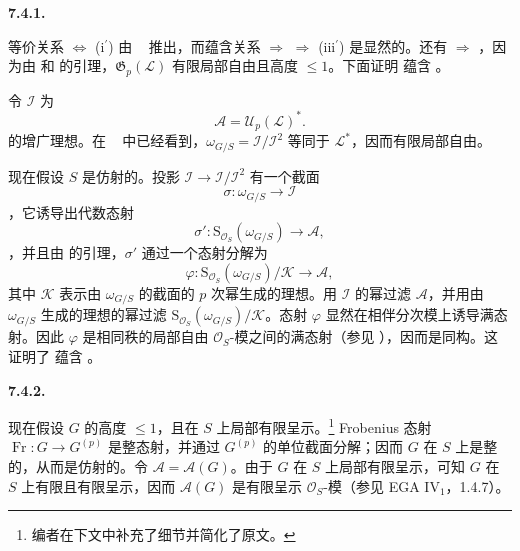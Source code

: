 \medskip
\noindent\textbf{7.4.1.}
\label{sga3:VIIA:7.4.1}

等价关系  \(\Leftrightarrow\) (i\(^{\prime}\)) 由 ~ 推出，而蕴含关系  \(\Rightarrow\)  \(\Rightarrow\) (iii\(^{\prime}\)) 是显然的。还有  \(\Rightarrow\) ，因为由  和  的引理，\(\mathfrak G_p(\mathcal L)\) 有限局部自由且高度 \(\leq1\)。下面证明  蕴含 。

令 \(\mathcal I\) 为
\[
  \mathcal A=\mathcal U_p(\mathcal L)^{*}.
\]
的增广理想。在 ~ 中已经看到，\(\omega_{G/S}=\mathcal I/\mathcal I^2\) 等同于 \(\mathcal L^{*}\)，因而有限局部自由。

现在假设 \(S\) 是仿射的。投影 \(\mathcal I\to\mathcal I/\mathcal I^2\) 有一个截面
\[
  \sigma:\omega_{G/S}\longrightarrow\mathcal I
\]
，它诱导出代数态射
\[
  \sigma':
  \mathrm S_{\mathcal O_S}(\omega_{G/S})
  \longrightarrow
  \mathcal A,
\]
，并且由  的引理，\(\sigma'\) 通过一个态射分解为
\[
  \varphi:
  \mathrm S_{\mathcal O_S}(\omega_{G/S})/\mathcal K
  \longrightarrow
  \mathcal A,
\]
其中 \(\mathcal K\) 表示由 \(\omega_{G/S}\) 的截面的 \(p\) 次幂生成的理想。用 \(\mathcal I\) 的幂过滤 \(\mathcal A\)，并用由 \(\omega_{G/S}\) 生成的理想的幂过滤 \(\mathrm S_{\mathcal O_S}(\omega_{G/S})/\mathcal K\)。态射 \(\varphi\) 显然在相伴分次模上诱导满态射。因此 \(\varphi\) 是相同秩的局部自由 \(\mathcal O_S\)-模之间的满态射（参见 ），因而是同构。这证明了  蕴含 。

\medskip
\noindent\textbf{7.4.2.}
\label{sga3:VIIA:7.4.2}

现在假设 \(G\) 的高度 \(\leq1\)，且在 \(S\) 上局部有限呈示。\footnote{编者在下文中补充了细节并简化了原文。}
Frobenius 态射 \(\operatorname{Fr}:G\to G^{(p)}\) 是整态射，并通过 \(G^{(p)}\) 的单位截面分解；因而 \(G\) 在 \(S\) 上是整的，从而是仿射的。令 \(\mathcal A=\mathcal A(G)\)。由于 \(G\) 在 \(S\) 上局部有限呈示，可知 \(G\) 在 \(S\) 上有限且有限呈示，因而 \(\mathcal A(G)\) 是有限呈示 \(\mathcal O_S\)-模（参见 EGA IV\(_1\)，1.4.7）。

